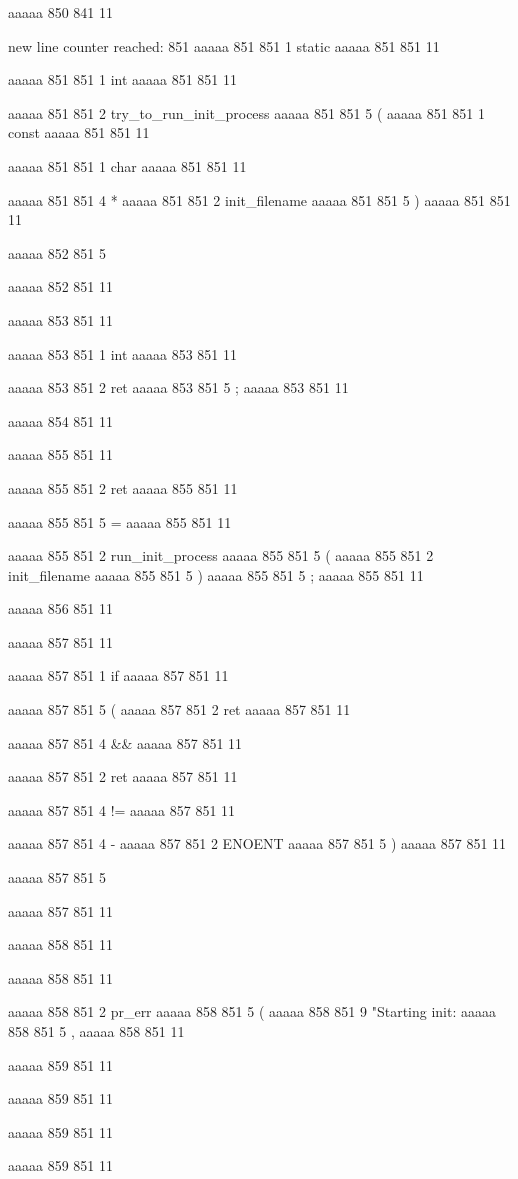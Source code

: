aaaaa 850 841
11


new line counter reached: 851
aaaaa 851 851
1
static
aaaaa 851 851
11
 
aaaaa 851 851
1
int
aaaaa 851 851
11
 
aaaaa 851 851
2
try_to_run_init_process
aaaaa 851 851
5
(
aaaaa 851 851
1
const
aaaaa 851 851
11
 
aaaaa 851 851
1
char
aaaaa 851 851
11
 
aaaaa 851 851
4
*
aaaaa 851 851
2
init_filename
aaaaa 851 851
5
)
aaaaa 851 851
11


aaaaa 852 851
5
{
aaaaa 852 851
11


aaaaa 853 851
11
	
aaaaa 853 851
1
int
aaaaa 853 851
11
 
aaaaa 853 851
2
ret
aaaaa 853 851
5
;
aaaaa 853 851
11


aaaaa 854 851
11


aaaaa 855 851
11
	
aaaaa 855 851
2
ret
aaaaa 855 851
11
 
aaaaa 855 851
5
=
aaaaa 855 851
11
 
aaaaa 855 851
2
run_init_process
aaaaa 855 851
5
(
aaaaa 855 851
2
init_filename
aaaaa 855 851
5
)
aaaaa 855 851
5
;
aaaaa 855 851
11


aaaaa 856 851
11


aaaaa 857 851
11
	
aaaaa 857 851
1
if
aaaaa 857 851
11
 
aaaaa 857 851
5
(
aaaaa 857 851
2
ret
aaaaa 857 851
11
 
aaaaa 857 851
4
&&
aaaaa 857 851
11
 
aaaaa 857 851
2
ret
aaaaa 857 851
11
 
aaaaa 857 851
4
!=
aaaaa 857 851
11
 
aaaaa 857 851
4
-
aaaaa 857 851
2
ENOENT
aaaaa 857 851
5
)
aaaaa 857 851
11
 
aaaaa 857 851
5
{
aaaaa 857 851
11


aaaaa 858 851
11
	
aaaaa 858 851
11
	
aaaaa 858 851
2
pr_err
aaaaa 858 851
5
(
aaaaa 858 851
9
"Starting init: %
aaaaa 858 851
5
,
aaaaa 858 851
11


aaaaa 859 851
11
	
aaaaa 859 851
11
	
aaaaa 859 851
11
 
aaaaa 859 851
11
 
}}
